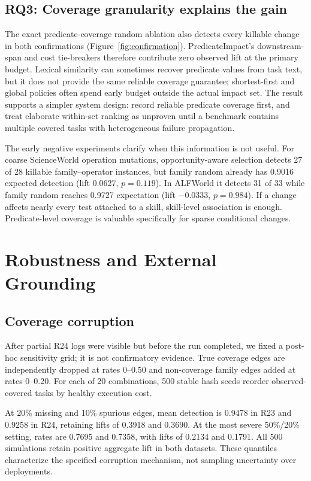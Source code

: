 \documentclass[10pt]{article}
\begin{document}
\subsection{RQ3: Coverage granularity explains the gain}
The exact predicate-coverage random ablation also detects every killable change in both confirmations (Figure~\ref{fig:confirmation}). PredicateImpact's downstream-span and cost tie-breakers therefore contribute zero observed lift at the primary budget. Lexical similarity can sometimes recover predicate values from task text, but it does not provide the same reliable coverage guarantee; shortest-first and global policies often spend early budget outside the actual impact set. The result supports a simpler system design: record reliable predicate coverage first, and treat elaborate within-set ranking as unproven until a benchmark contains multiple covered tasks with heterogeneous failure propagation.

The early negative experiments clarify when this information is not useful. For coarse ScienceWorld operation mutations, opportunity-aware selection detects 27 of 28 killable family--operator instances, but family random already has 0.9016 expected detection (lift 0.0627, $p=0.119$). In ALFWorld it detects 31 of 33 while family random reaches 0.9727 expectation (lift $-0.0333$, $p=0.984$). If a change affects nearly every test attached to a skill, skill-level association is enough. Predicate-level coverage is valuable specifically for sparse conditional changes.

\section{Robustness and External Grounding}
\subsection{Coverage corruption}
After partial R24 logs were visible but before the run completed, we fixed a post-hoc sensitivity grid; it is not confirmatory evidence. True coverage edges are independently dropped at rates 0--0.50 and non-coverage family edges added at rates 0--0.20. For each of 20 combinations, 500 stable hash seeds reorder observed-covered tasks by healthy execution cost.

At 20\% missing and 10\% spurious edges, mean detection is 0.9478 in R23 and 0.9258 in R24, retaining lifts of 0.3918 and 0.3690. At the most severe 50\%/20\% setting, rates are 0.7695 and 0.7358, with lifts of 0.2134 and 0.1791. All 500 simulations retain positive aggregate lift in both datasets. These quantiles characterize the specified corruption mechanism, not sampling uncertainty over deployments.
\end{document}
